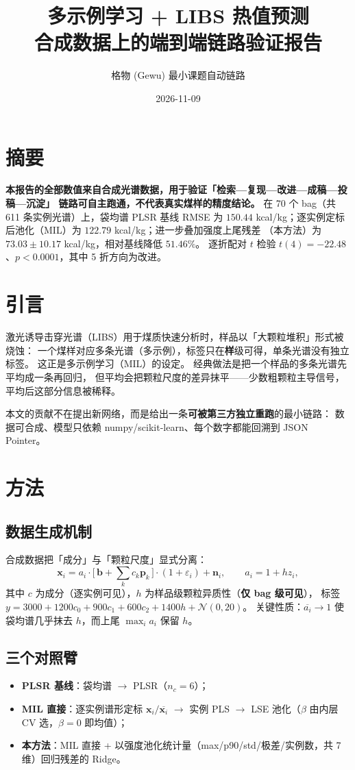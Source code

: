 \documentclass[11pt,a4paper,UTF8]{ctexart}
\title{多示例学习 + LIBS 热值预测\\[2pt]\large 合成数据上的端到端链路验证报告}
\author{格物 (Gewu) 最小课题自动链路}
\date{2026-11-09}
\begin{document}
\maketitle

\section*{摘要}
\noindent\textbf{本报告的全部数值来自合成光谱数据，用于验证「检索—复现—改进—成稿—投稿—沉淀」
链路可自主跑通，不代表真实煤样的精度结论。}
在 70 个 bag（共 611 条实例光谱）上，袋均谱 PLSR 基线 RMSE 为
$150.44$ kcal/kg；逐实例定标后池化（MIL）为 $122.79$ kcal/kg；进一步叠加强度上尾残差
（本方法）为 $73.03 \pm 10.17$ kcal/kg，相对基线降低 $51.46\%$。
逐折配对 $t$ 检验 $t(4)=-22.48$、$p<0.0001$，其中 5 折方向为改进。

\section{引言}
激光诱导击穿光谱（LIBS）用于煤质快速分析时，样品以「大颗粒堆积」形式被烧蚀：
一个煤样对应多条光谱（多示例），标签只在\textbf{样}级可得，单条光谱没有独立标签。
这正是多示例学习（MIL）的设定\cite{ilse2018mil}。
经典做法是把一个样品的多条光谱先平均成一条再回归\cite{li2014pls,yan2023coal}，
但平均会把颗粒尺度的差异抹平——少数粗颗粒主导信号，平均后这部分信息被稀释。

本文的贡献不在提出新网络，而是给出一条\textbf{可被第三方独立重跑}的最小链路：
数据可合成、模型只依赖 numpy/scikit-learn、每个数字都能回溯到 JSON Pointer。

\section{方法}
\subsection{数据生成机制}
合成数据把「成分」与「颗粒尺度」显式分离：
\begin{equation}
  \mathbf{x}_i = a_i \cdot \bigl[\, \mathbf{b} + \sum_k c_k \mathbf{p}_k \,\bigr] \cdot (1+\varepsilon_i) + \mathbf{n}_i,
  \qquad a_i = 1 + h z_i,
\end{equation}
其中 $c$ 为成分（逐实例可见），$h$ 为样品级颗粒异质性（\textbf{仅 bag 级可见}），
标签 $y = 3000 + 1200c_0 + 900c_1 + 600c_2 + 1400h + \mathcal{N}(0,20)$。
关键性质：$\overline{a_i} \to 1$ 使袋均谱几乎抹去 $h$，而上尾 $\max_i a_i$ 保留 $h$。

\subsection{三个对照臂}
\begin{itemize}
  \item \textbf{PLSR 基线}：袋均谱 $\to$ PLSR（$n_c=6$）；
  \item \textbf{MIL 直接}：逐实例谱形定标 $\mathbf{x}_i/\overline{\mathbf{x}_i}$ $\to$ 实例 PLS $\to$
        LSE 池化（$\beta$ 由内层 CV 选，$\beta=0$ 即均值）；
  \item \textbf{本方法}：MIL 直接 + 以强度池化统计量（max/p90/std/极差/实例数，共 7 维）回归残差的 Ridge。
\end{itemize}
\end{document}
